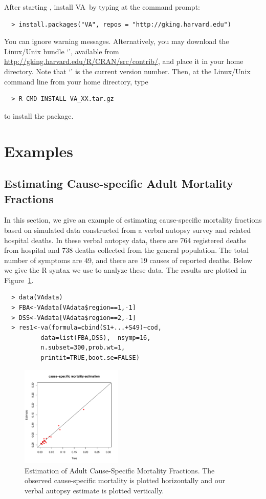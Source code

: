 \documentclass[oneside,letterpaper,titlepage]{article}
\newcommand{\VA}{\textsc{VA}}
\begin{document}
After starting , install \VA\ by typing at the 
command prompt:
\begin{verbatim}
  > install.packages("VA", repos = "http://gking.harvard.edu")
\end{verbatim}

You can ignore warning messages.  Alternatively, you may download the
Linux/Unix bundle `', available from
\url{http://gking.harvard.edu/R/CRAN/src/contrib/}, and place it in
your home directory.  Note that `' is the current version
number.  Then, at the Linux/Unix command line from your home
directory, type
\begin{verbatim}
  > R CMD INSTALL VA_XX.tar.gz
\end{verbatim}
to install the package.

\section{Examples}

\subsection{Estimating Cause-specific Adult Mortality Fractions}
\label{sec:tanz}

In this section, we give an example of estimating cause-specific
mortality fractions based on simulated data constructed from a verbal
autopsy survey and related hospital deaths. In these verbal autopsy
data, there are 764 registered deaths from hospital and 738 deaths
collected from the general population. The total number of symptoms
are 49, and there are 19 causes of reported deaths. Below we give the
R syntax we use to analyze these data.  The results are plotted in
Figure~\ref{fig1}.

  \begin{verbatim}
  > data(VAdata)
  > FBA<-VAdata[VAdata$region==1,-1]
  > DSS<-VAdata[VAdata$region==2,-1]
  > res1<-va(formula=cbind(S1+...+S49)~cod,
          data=list(FBA,DSS),  nsymp=16,
          n.subset=300,prob.wt=1,
          printit=TRUE,boot.se=FALSE)
  \end{verbatim}

 \begin{figure}[h]
  \centering
  \includegraphics[height=1.9in]{fig1}
  \caption{Estimation of Adult Cause-Specific Mortality Fractions. 
    The observed cause-specific mortality is plotted horizontally and
    our verbal autopsy estimate is plotted vertically.}
  \label{fig1}
\end{figure}
\end{document}
